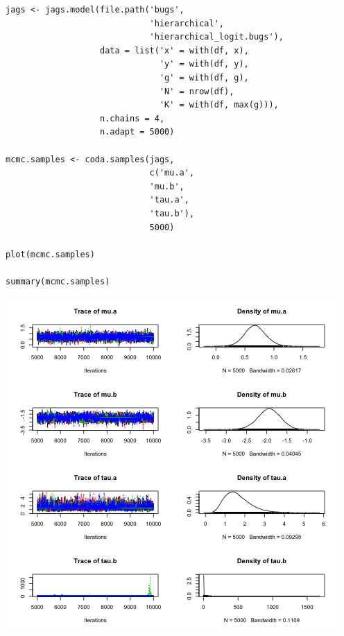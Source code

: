 \documentclass{beamer}
\begin{document}
\begin{frame}[fragile]
  \begin{verbatim}
jags <- jags.model(file.path('bugs',
                             'hierarchical',
                             'hierarchical_logit.bugs'),
                   data = list('x' = with(df, x),
                               'y' = with(df, y),
                               'g' = with(df, g),
                               'N' = nrow(df),
                               'K' = with(df, max(g))),
                   n.chains = 4,
                   n.adapt = 5000)

mcmc.samples <- coda.samples(jags,
                             c('mu.a',
                             'mu.b',
                             'tau.a',
                             'tau.b'),
                             5000)

plot(mcmc.samples)

summary(mcmc.samples)
  \end{verbatim}
\end{frame}

\begin{frame}[fragile]
  \begin{center}
    \includegraphics[scale = 0.4]{../graphs/hierarchical/logit_plot1.png}
  \end{center}
\end{frame}
\end{document}

